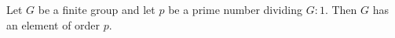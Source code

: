 Let $G$ be a finite group and let $p$ be a prime number dividing $G:1$. Then $G$ has an element of order $p$.
